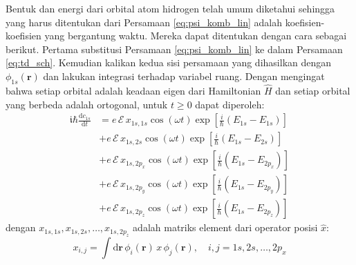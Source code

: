 \documentclass[a4paper,bahasa]{paper}
\renewcommand{\imath}{\mathfrak{i}}
\begin{document}
Bentuk dan energi dari orbital atom hidrogen telah umum diketahui sehingga yang harus
ditentukan dari Persamaan \eqref{eq:psi_komb_lin} adalah koefisien-koefisien
yang bergantung waktu. Mereka dapat ditentukan dengan cara sebagai berikut.
Pertama substitusi Persamaan \eqref{eq:psi_komb_lin} ke dalam Persamaan \eqref{eq:td_sch}.
Kemudian kalikan kedua sisi persamaan yang dihasilkan dengan $\phi_{1s}(\mathbf{r})$
dan lakukan integrasi terhadap variabel ruang. Dengan mengingat bahwa setiap orbital
adalah keadaan eigen dari Hamiltonian $\hat{H}$ dan setiap orbital yang berbeda
adalah ortogonal, untuk $t \geq 0$ dapat diperoleh:
%
\begin{align}
\imath\hbar\frac{\mathrm{d}c_{1s}}{\mathrm{d}t} & =
e\,\mathcal{E}\,x_{1s,1s}\cos(\omega t)\exp\left[\frac{i}{\hbar}(E_{1s} - E_{1s})\right] \\
& + e\,\mathcal{E}\,x_{1s,2s}\cos(\omega t)\exp\left[\frac{i}{\hbar}(E_{1s} - E_{2s})\right] \\
& + e\,\mathcal{E}\,x_{1s,2p_{x}}\cos(\omega t)\exp\left[\frac{i}{\hbar}(E_{1s} - E_{2p_{x}})\right] \\
& + e\,\mathcal{E}\,x_{1s,2p_{y}}\cos(\omega t)\exp\left[\frac{i}{\hbar}(E_{1s} - E_{2p_{y}})\right] \\
& + e\,\mathcal{E}\,x_{1s,2p_{z}}\cos(\omega t)\exp\left[\frac{i}{\hbar}(E_{1s} - E_{2p_{z}})\right]
\end{align}
%
dengan $x_{1s,1s}, x_{1s,2s}, \ldots, x_{1s,2p_{z}}$ adalah matriks element dari
operator posisi $\hat{x}$:
\begin{equation}
x_{i,j} = \int\mathrm{d}\mathbf{r}\,\phi_{i}(\mathbf{r})\,x\,\phi_{j}(\mathbf{r}),\hspace{1em}
i,j = 1s, 2s, \ldots, 2p_{x}
\end{equation}
\end{document}
